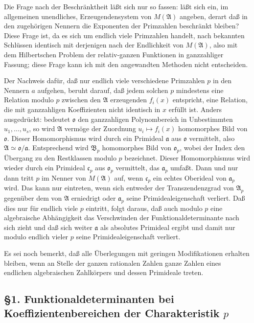 \documentclass[11pt]{article}
\providecommand{\frakA}{\mathfrak A}
\providecommand{\frakB}{\mathfrak B}
\providecommand{\frako}{\mathfrak o}
\providecommand{\fraka}{\mathfrak a}
\providecommand{\frakc}{\mathfrak c}
\begin{document}
Die Frage nach der Beschränktheit läßt sich nur so fassen: läßt sich ein, im allgemeinen unendliches, Erzeugendensystem von \(M(\frakA)\) angeben, derart daß in den zugehörigen Nennern die Exponenten der Primzahlen beschränkt bleiben? Diese Frage ist, da es sich um endlich viele Primzahlen handelt, nach bekannten Schlüssen identisch mit derjenigen nach der Endlichkeit von \(M(\frakA)\), also mit dem Hilbertschen Problem der relativ-ganzen Funktionen in ganzzahliger Fassung; diese Frage kann ich mit den angewandten Methoden nicht entscheiden.

Der Nachweis dafür, daß nur endlich viele verschiedene Primzahlen \(p\) in den Nennern \(a\) aufgehen, beruht darauf, daß jedem solchen \(p\) mindestens eine Relation modulo \(p\) zwischen den \(\frakA\) erzeugenden \(f_i(x)\) entspricht, eine Relation, die mit ganzzahligen Koeffizienten nicht identisch in \(x\) erfüllt ist. Anders ausgedrückt: bedeutet \(\frako\) den ganzzahligen Polynombereich in Unbestimmten \(u_1,\ldots,u_s\), so wird \(\frakA\) vermöge der Zuordnung \(u_i\mapsto f_i(x)\) homomorphes Bild von \(\frako\). Dieser Homomorphismus wird durch ein Primideal \(\fraka\) aus \(\frako\) vermittelt, also \(\frakA\simeq\frako/\fraka\). Entsprechend wird \(\frakB_p\) homomorphes Bild von \(\frako_p\), wobei der Index den Übergang zu den Restklassen modulo \(p\) bezeichnet. Dieser Homomorphismus wird wieder durch ein Primideal \(\frakc_p\) aus \(\frako_p\) vermittelt, das \(\fraka_p\) umfaßt. Dann und nur dann tritt \(p\) im Nenner von \(M(\frakA)\) auf, wenn \(\frakc_p\) ein echtes Oberideal von \(\fraka_p\) wird. Das kann nur eintreten, wenn sich entweder der Transzendenzgrad von \(\frakA_p\) gegenüber dem von \(\frakA\) erniedrigt oder \(\fraka_p\) seine Primidealeigenschaft verliert. Daß dies nur für endlich viele \(p\) eintritt, folgt daraus, daß auch modulo \(p\) eine algebraische Abhängigkeit das Verschwinden der Funktionaldeterminante nach sich zieht und daß sich weiter \(\fraka\) als absolutes Primideal ergibt und damit nur modulo endlich vieler \(p\) seine Primidealeigenschaft verliert.

Es sei noch bemerkt, daß alle Überlegungen mit geringen Modifikationen erhalten bleiben, wenn an Stelle der ganzen rationalen Zahlen ganze Zahlen eines endlichen algebraischen Zahlkörpers und dessen Primideale treten.

\subsection*{§1. Funktionaldeterminanten bei Koeffizientenbereichen der Charakteristik \(p\)}
\end{document}
